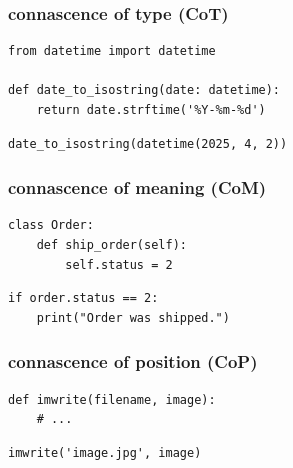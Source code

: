 \documentclass[aspectratio=169,12pt,xcolor=dvipsnames]{beamer}
\begin{document}
\begin{frame}[fragile]
  \frametitle{connascence of type (CoT)}
  \begin{center}
    \begin{minipage}[c]{.65\textwidth}
      \begin{verbatim}
from datetime import datetime

def date_to_isostring(date: datetime):
    return date.strftime('%Y-%m-%d')
      \end{verbatim}
    \end{minipage}
    \begin{minipage}[c]{.65\textwidth}
      \begin{verbatim}
date_to_isostring(datetime(2025, 4, 2))
      \end{verbatim}
    \end{minipage}
  \end{center}
\end{frame}

\begin{frame}[fragile]
  \frametitle{connascence of meaning (CoM)}
  \begin{center}
    \begin{minipage}[c]{.5\textwidth}
      \begin{verbatim}
class Order:
    def ship_order(self):
        self.status = 2
      \end{verbatim}
    \end{minipage}
    \begin{minipage}[c]{.5\textwidth}
      \begin{verbatim}
if order.status == 2:
    print("Order was shipped.")
      \end{verbatim}
    \end{minipage}
  \end{center}
\end{frame}

\begin{frame}[fragile]
  \frametitle{connascence of position (CoP)}
  \begin{center}
    \begin{minipage}[c]{.5\textwidth}
      \begin{verbatim}
def imwrite(filename, image):
    # ...
      \end{verbatim}
    \end{minipage}
    \begin{minipage}[c]{.5\textwidth}
      \begin{verbatim}
imwrite('image.jpg', image)
      \end{verbatim}
    \end{minipage}
  \end{center}
\end{frame}
\end{document}
